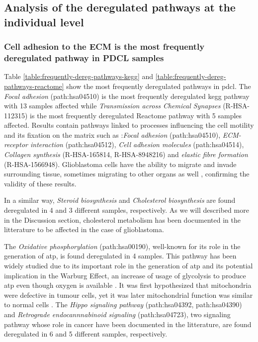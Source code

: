 \subsection{Analysis of the deregulated pathways at the individual level}

\subsubsection{Cell adhesion to the ECM is the most frequently deregulated pathway in PDCL samples}

Table \ref*{table:frequently-dereg-pathways-kegg} and \ref*{table:frequently-dereg-pathways-reactome} show the most frequently deregulated pathways in \acrshort{pdcl}.
The \textit{Focal adhesion} (path:hsa04510) is the most frequently deregulated \acrshort{kegg} pathway with 13 samples affected while \textit{Transmission across Chemical Synapses} (R-HSA-112315) is the most frequently deregulated Reactome pathway with 5 samples affected.
Results contain pathways linked to processes influencing the cell motility and its fixation on the matrix such as :\textit{Focal adhesion} (path:hsa04510), \textit{ECM-receptor interaction} (path:hsa04512), \textit{Cell adhesion molecules} (path:hsa04514), \textit{Collagen synthesis} (R-HSA-165814, R-HSA-8948216) and \textit{elastic fibre formation} (R-HSA-1566948).
Glioblastoma cells have the ability to migrate and invade surrounding tissue, sometimes migrating to other organs as well \cite*{Lah2020}, confirming the validity of these results.

In a similar way, \textit{Steroid biosynthesis} and \textit{Cholesterol biosynthesis} are found deregulated in 4 and 3 different samples, respectively.
As we will described more in the Discussion section, cholesterol metabolism has been documented in the litterature to be affected in the case of glioblastoma.

The \textit{Oxidative phosphorylation} (path:hsa00190), well-known for its role in the generation of \acrshort{atp}, is found deregulated in 4 samples.
This pathway has been widely studied due to its important role in the generation of \acrshort{atp} and its potential implication in the Warburg Effect, an increase of usage of glycolysis to produce \acrshort{atp} even though oxygen is available \cite*{Spinicci2022}.
It was first hypothesized that mitochondria were defective in tumour cells, yet it was later mitochondrial function was similar to normal cells \cite*{Cairns2011}.
The \textit{Hippo signaling pathway} (path:hsa04392, path:hsa04390) and \textit{Retrograde endocannnabinoid signaling} (path:hsa04723), two signaling pathway whose role in cancer have been documented in the litterature, are found deregulated in 6 and 5 different samples, respectively.

